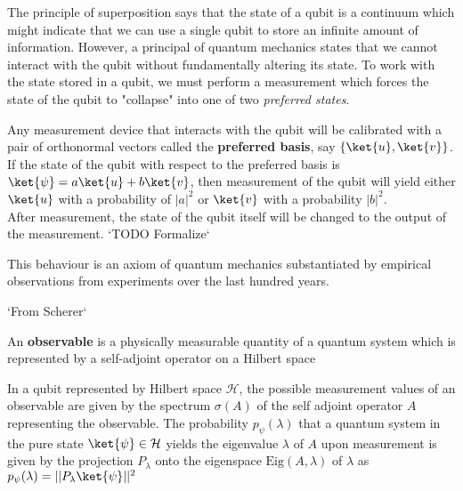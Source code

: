 \iffalse
Like qubits are modelled by $2$-dimensional Hilbert spaces, there could be quantum systems whose states are modelled as vectors in $3$-dimensional vector spaces, these are called \textbf{qutrits}. Similarly, quantum systems whose states are modelled with $n$-dimensional vector spaces are called \textbf{qudits}. A result shows that a system of qutrits or qudits can be reduced to a system of multiple qubits that has similar efficiency, so these systems are rarely used.
\fi

The principle of superposition says that the state of a qubit is a continuum which might indicate that we can use a single qubit to store an infinite amount of information. However, a principal of quantum mechanics states that we cannot interact with the qubit without fundamentally altering its state. To work with the state stored in a qubit, we must perform a measurement which forces the state of the qubit to "collapse" into one of two \textit{preferred states}.

\begin{lemma}
    Any measurement device that interacts with the qubit will be calibrated with a pair of orthonormal vectors called the \textbf{preferred basis}, say $\{ \ket{u}, \ket{v} \}$. If the state of the qubit with respect to the preferred basis is $\ket{\psi} = a \ket{u} + b \ket{v}$, then measurement of the qubit will yield either $\ket{u}$ with a probability of $|a|^2$ or $\ket{v}$ with a probability $|b|^2$. \\
After measurement, the state of the qubit itself will be changed to the output of the measurement.
`TODO Formalize`
\end{lemma}

This behaviour is an axiom of quantum mechanics substantiated by empirical observations from experiments over the last hundred years.

`From Scherer`
\begin{defn}
    An \textbf{observable} is a physically measurable quantity of a quantum system which is represented by a self-adjoint operator on a Hilbert space
\end{defn}

\begin{lemma}
    In a qubit represented by Hilbert space $\mathcal{H}$, the possible measurement values of an observable are given by the spectrum $\sigma(A)$ of the self adjoint operator $A$ representing the observable.
    The probability $p_\psi(\lambda)$ that a quantum system in the pure state $\ket{\psi} \in \mathcal{H}$ yields the eigenvalue $\lambda$ of $A$ upon measurement is given by the projection $P_\lambda$ onto the eigenspace $\text{Eig}(A, \lambda)$ of $\lambda$ as $p_\psi(\lambda) = || P_\lambda \ket{\psi} ||^2$
\end{lemma}

